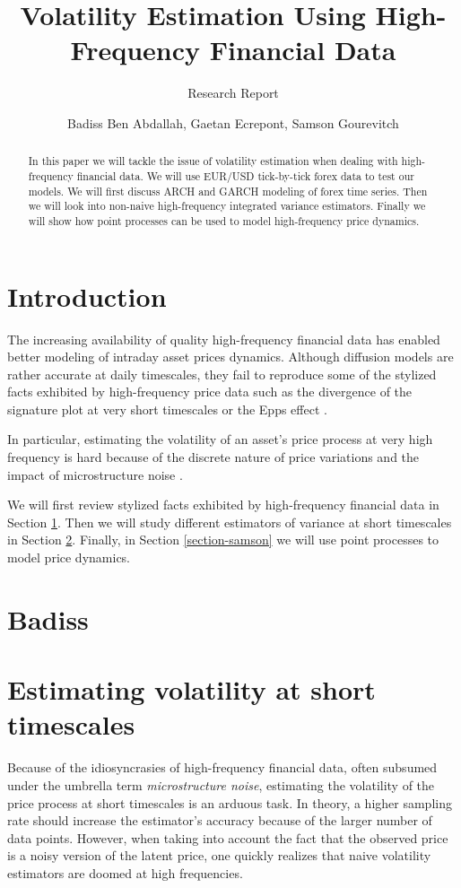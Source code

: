 \documentclass[a4paper,12pt,twoside]{article}
\author{Badiss Ben Abdallah, Gaetan Ecrepont, Samson Gourevitch}
\title{Volatility Estimation Using High-Frequency Financial Data}
\subtitle{Research Report}%
\begin{document}
	\maketitle 
	\tableofcontents

\newpage

 \begin{abstract}
    In this paper we will tackle the issue of volatility estimation when dealing with high-frequency financial data. We will use EUR/USD tick-by-tick forex data to test our models. We will first discuss ARCH and GARCH modeling of forex time series. Then we will look into non-naive high-frequency integrated variance estimators. Finally we will show how point processes can be used to model high-frequency price dynamics.
\end{abstract}


\section*{Introduction}
    
    The increasing availability of quality high-frequency financial data has enabled better modeling of intraday asset prices dynamics. Although diffusion models are rather accurate at daily timescales, they fail to reproduce some of the stylized facts exhibited by high-frequency price data such as the divergence of the signature plot at very short timescales \cite{signature_plot} or the Epps effect \cite{epps}.
    
    In particular, estimating the volatility of an asset's price process at very high frequency is hard because of the discrete nature of price variations and the impact of microstructure noise \cite{bacry}.

    We will first review stylized facts exhibited by high-frequency financial data in Section \ref{section-badiss}. Then we will study different estimators of variance at short timescales in Section \ref{section-gaetan}. Finally, in Section \ref{section-samson} we will use point processes to model price dynamics.

\newpage
\section{Badiss} \label{section-badiss}

\newpage

\section{Estimating volatility at short timescales} \label{section-gaetan}
Because of the idiosyncrasies of high-frequency financial data, often subsumed under the umbrella term \textit{microstructure noise}, estimating the volatility of the price process at short timescales is an arduous task. In theory, a higher sampling rate should increase the estimator's accuracy because of the larger number of data points. However, when taking into account the fact that the observed price is a noisy version of the latent price, one quickly realizes that naive volatility estimators are doomed at high frequencies.
\end{document}
